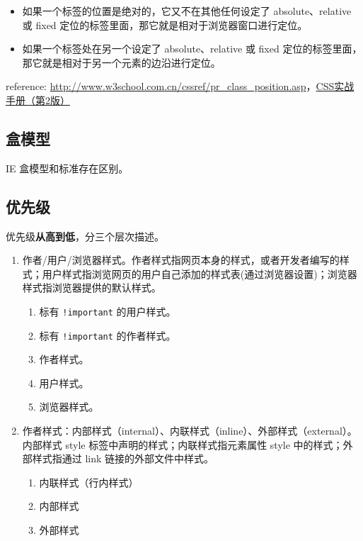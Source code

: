 \begin{itemize}
\tightlist
\item
  如果一个标签的位置是绝对的，它又不在其他任何设定了 absolute、relative
  或 fixed 定位的标签里面，那它就是相对于浏览器窗口进行定位。
\item
  如果一个标签处在另一个设定了 absolute、relative 或 fixed
  定位的标签里面，那它就是相对于另一个元素的边沿进行定位。
\end{itemize}

reference:
\url{http://www.w3school.com.cn/cssref/pr_class_position.asp}，\href{http://book.douban.com/subject/4861462/}{CSS实战手册（第2版）}

\subsection{盒模型}\label{ux76d2ux6a21ux578b}

IE 盒模型和标准存在区别。

\subsection{优先级}\label{ux4f18ux5148ux7ea7}

优先级\textbf{从高到低}，分三个层次描述。

\begin{enumerate}
\def\labelenumi{\arabic{enumi}.}
\tightlist
\item
  作者/用户/浏览器样式。作者样式指网页本身的样式，或者开发者编写的样式；用户样式指浏览网页的用户自己添加的样式表(通过浏览器设置)；浏览器样式指浏览器提供的默认样式。

  \begin{enumerate}
  \def\labelenumii{\arabic{enumii}.}
  \tightlist
  \item
    标有 \lstinline"!important" 的用户样式。
  \item
    标有 \lstinline"!important" 的作者样式。
  \item
    作者样式。
  \item
    用户样式。
  \item
    浏览器样式。
  \end{enumerate}
\item
  作者样式：内部样式（internal）、内联样式（inline）、外部样式（external）。内部样式
  style 标签中声明的样式；内联样式指元素属性 style
  中的样式；外部样式指通过 link 链接的外部文件中样式。

  \begin{enumerate}
  \def\labelenumii{\arabic{enumii}.}
  \tightlist
  \item
    内联样式（行内样式）
  \item
    内部样式
  \item
    外部样式
  \end{enumerate}
\end{enumerate}

